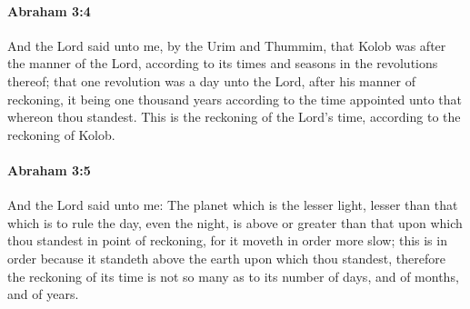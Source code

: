 		\paragraph{Abraham 3:4} %
			\label{ABRAHAM-3-4}

			And the Lord said unto me, by the Urim and Thummim, that Kolob was after the manner of the Lord, according to its times and seasons in the revolutions thereof; that one revolution was a day unto the Lord, after his manner of reckoning, it being one thousand years according to the time appointed unto that whereon thou standest.  This is the reckoning of the Lord's time, according to the reckoning of Kolob.


		\paragraph{Abraham 3:5} %
			\label{ABRAHAM-3-5}

			And the Lord said unto me: The planet which is the lesser light, lesser than that which is to rule the day, even the night, is above or greater than that upon which thou standest in point of reckoning, for it moveth in order more slow; this is in order because it standeth above the earth upon which thou standest, therefore the reckoning of its time is not so many as to its number of days, and of months, and of years.


